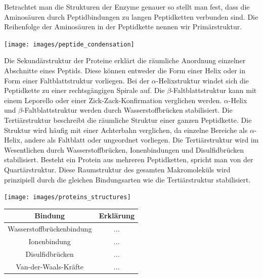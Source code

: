 \documentclass{scrartcl}  %
\begin{document}
\begin{tcolorbox}
				Betrachtet man die Strukturen der Enzyme genauer so stellt man fest, dass die Aminosäuren durch Peptidbindungen zu langen Peptidketten verbunden sind. Die Reihenfolge der Aminosäuren in der Peptidkette nennen wir Primärstruktur.
				\begin{center}
					\texttt{[image: images/peptide\_condensation]}
				\end{center}
				Die Sekundärstruktur der Proteine erklärt die räumliche Anordnung einzelner Abschnitte eines Peptids. Diese können entweder die Form einer Helix oder in Form einer Faltblattstruktur vorliegen. Bei der $\alpha$-Helixstruktur windet sich die Peptidkette zu einer rechtsgängigen Spirale auf. Die $\beta$-Faltblattstruktur kann mit einem Leporello oder einer Zick-Zack-Konfirmation verglichen werden. $\alpha$-Helix und $\beta$-Faltblattstruktur werden durch Wasserstoffbrücken stabilisiert. \newline
				Die Tertiärstruktur beschreibt die räumliche Struktur einer ganzen Peptidkette. Die Struktur wird häufig mit einer Achterbahn verglichen, da einzelne Bereiche als $\alpha$-Helix, andere als Faltblatt oder ungeordnet vorliegen. Die Tertiärstruktur wird im Wesentlichen durch Wasserstoffbrücken, Ionenbindungen und Disulfidbrücken stabilisiert. \newline
				Besteht ein Protein aus mehreren Peptidketten, spricht man von der Quartärstruktur. Diese Raumstruktur des gesamten Makromoleküls wird prinzipiell durch die gleichen Bindungsarten wie die Tertiärstruktur stabilisiert.		
				\begin{center}
					\texttt{[image: images/proteins\_structures]}
				\end{center}
			\end{tcolorbox}	
			
			
			
\vspace{0.3cm}
			\begin{center}
				\begin{tabular}{|c|c|}
					\hline
					\textbf{Bindung} & \textbf{Erklärung} \\
					\hline
					Wasserstoffbrückenbindung & ... \\
					\hline
					Ionenbindung & ... \\
					\hline
					Disulfidbrücken & ... \\
					\hline
					Van-der-Waals-Kräfte & ... \\ 
					\hline
				\end{tabular}
			\end{center}
			
\end{document}
